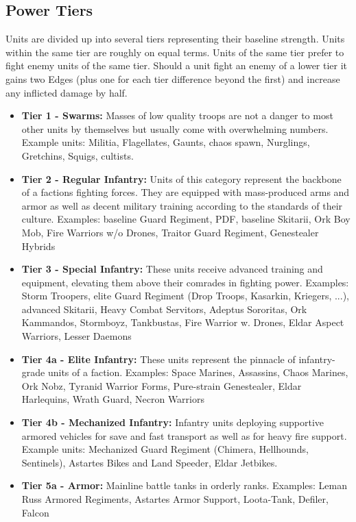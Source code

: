 \subsection{Power Tiers}
Units are divided up into several tiers representing their baseline strength. 
Units within the same tier are roughly on equal terms. 
Units of the same tier prefer to fight enemy units of the same tier.
Should a unit fight an enemy of a lower tier it gains two Edges (plus one for each tier difference beyond the first) and increase any inflicted damage by half.
\begin{itemize}
	\item \textbf{Tier 1 - Swarms:} Masses of low quality troops are not a danger to most other units by themselves but usually come with overwhelming numbers. Example units: Militia, Flagellates, Gaunts, chaos spawn, Nurglings, Gretchins, Squigs, cultists.
	\item \textbf{Tier 2 - Regular Infantry:} Units of this category represent the backbone of a factions fighting forces. They are equipped with mass-produced arms and armor as well as decent military training according to the standards of their culture. Examples: baseline Guard Regiment, PDF, baseline Skitarii, Ork Boy Mob, Fire Warriors w/o Drones, Traitor Guard Regiment, Genestealer Hybrids
	\item \textbf{Tier 3 - Special Infantry:} These units receive advanced training and equipment, elevating them above their comrades in fighting power. Examples: Storm Troopers, elite Guard Regiment (Drop Troops, Kasarkin, Kriegers, ...), advanced Skitarii, Heavy Combat Servitors, Adeptus Sororitas, Ork Kammandos, Stormboyz, Tankbustas, Fire Warrior w. Drones, Eldar Aspect Warriors, Lesser Daemons
	\item \textbf{Tier 4a - Elite Infantry:} These units represent the pinnacle of infantry-grade units of a faction. Examples: Space Marines, Assassins, Chaos Marines, Ork Nobz, Tyranid Warrior Forms, Pure-strain Genestealer, Eldar Harlequins, Wrath Guard, Necron Warriors
	\item \textbf{Tier 4b - Mechanized Infantry:} Infantry units deploying supportive armored vehicles for save and fast transport as well as for heavy fire support. Example units: Mechanized Guard Regiment (Chimera, Hellhounds, Sentinels), Astartes Bikes and Land Speeder, Eldar Jetbikes.
	\item \textbf{Tier 5a - Armor:} Mainline battle tanks in orderly ranks. Examples: Leman Russ Armored Regiments, Astartes Armor Support, Loota-Tank, Defiler, Falcon

\end{itemize}
